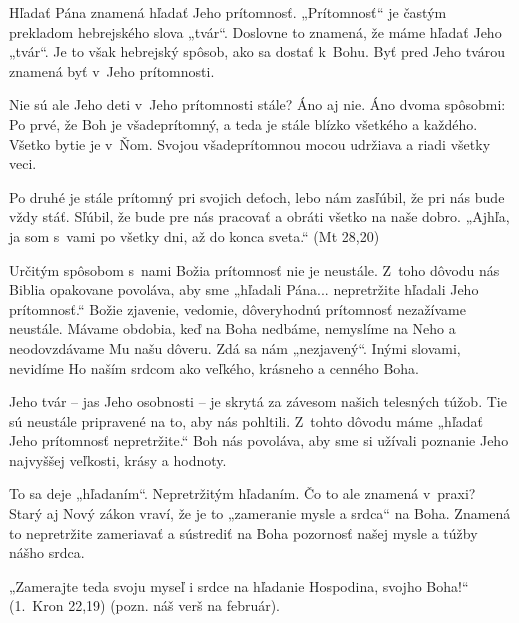 \def\velkostpisma{10}
\def\velkostriadku{12.5}




Hľadať Pána znamená hľadať Jeho prítomnosť. „Prítomnosť“ je častým prekladom hebrejského slova „tvár“. Doslovne to znamená, že máme hľadať Jeho „tvár“. Je to však hebrejský spôsob, ako sa dostať k~Bohu. Byť pred Jeho tvárou znamená byť v~Jeho prítomnosti.

Nie sú ale Jeho deti v~Jeho prítomnosti stále? Áno aj nie. Áno dvoma spôsobmi: Po prvé, že Boh je všadeprítomný, a teda je stále blízko všetkého a každého. Všetko bytie je v~Ňom. Svojou všadeprítomnou mocou udržiava a riadi všetky veci.

Po druhé je stále prítomný pri svojich deťoch, lebo nám zasľúbil, že pri nás bude vždy stáť. Sľúbil, že bude pre nás pracovať a obráti všetko na naše dobro. „Ajhľa, ja som s~vami po všetky dni, až do konca sveta.“ (Mt 28,20)


Určitým spôsobom s~nami Božia prítomnosť nie je neustále. Z~toho dôvodu nás Biblia opakovane povoláva, aby sme „hľadali Pána... nepretržite hľadali Jeho prítomnosť.“ Božie zjavenie, vedomie, dôveryhodnú prítomnosť nezažívame neustále. Mávame obdobia, keď na Boha nedbáme, nemyslíme na Neho a neodovzdávame Mu našu dôveru. Zdá sa nám „nezjavený“. Inými slovami, nevidíme Ho naším srdcom ako veľkého, krásneho a cenného Boha.

Jeho tvár -- jas Jeho osobnosti -- je skrytá za závesom našich telesných túžob. Tie sú neustále pripravené na to, aby nás pohltili. Z~tohto dôvodu máme „hľadať Jeho prítomnosť nepretržite.“ Boh nás povoláva, aby sme si užívali poznanie Jeho najvyššej veľkosti, krásy a hodnoty.


To sa deje „hľadaním“. Nepretržitým hľadaním. Čo to ale znamená v~praxi? Starý aj Nový zákon vraví, že je to „zameranie mysle a srdca“ na Boha. Znamená to nepretržite zameriavať a sústrediť na Boha pozornosť našej mysle a túžby nášho srdca.

„Zamerajte teda svoju myseľ i srdce na hľadanie Hospodina, svojho Boha!“ (1.~Kron 22,19)
(pozn. náš verš na február).

